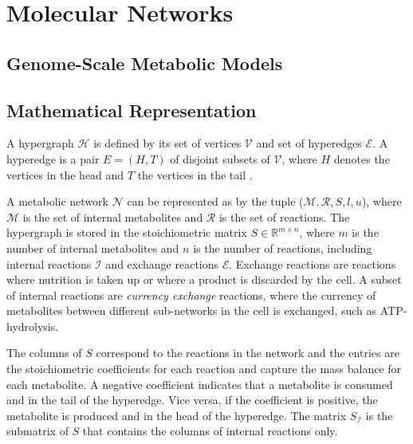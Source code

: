 \section{Molecular Networks}


\subsection{Genome-Scale Metabolic Models}

\subsection{Mathematical Representation}
A hypergraph $\mathscr{H}$ is defined by its set of vertices $\mathscr{V}$ and set of hyperedges $\mathscr{E}$. A hyperedge is a pair $E= (H,T)$ of disjoint subsets of $\mathscr{V}$, where $H$ denotes the vertices in the head and $T$ the vertices in the tail \cite{gallo_directed_1993}.


A metabolic network $\mathcal{N}$ can be represented as by the tuple ($\mathcal{M}, \mathcal{R}, S, l, u$), where $\mathcal M$ is the set of internal metabolites and $\mathcal{R}$ is the set of reactions. The hypergraph is stored in the stoichiometric matrix $S \in \mathbb{R}^{m\times n}$, where $m$ is the number of internal metabolites and $n$ is the number of reactions, including internal reactions $\mathcal{I}$ and exchange reactions $\mathcal{E}$. Exchange reactions are reactions where nutrition is taken up or where a product is discarded by the cell. 
A subset of internal reactions are \textit{currency exchange} reactions, where the currency of metabolites between different sub-networks in the cell is exchanged, such as ATP-hydrolysis. 

The columns of $S$ correspond to the reactions in the network and the entries are the stoichiometric coefficients for each reaction and capture the mass balance for each metabolite. A negative coefficient indicates that a metabolite is consumed and in the tail of the hyperedge. Vice versa, if the coefficient is positive, the metabolite is produced and in the head of the hyperedge.
The matrix $S_\mathcal{I}$ is the submatrix of $S$ that contains the columns of internal reactions only. 

